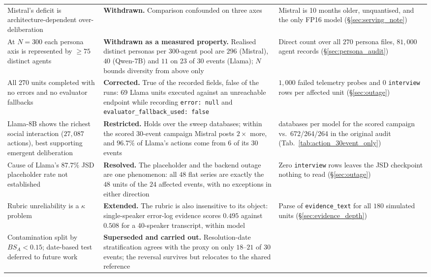 \documentclass[11pt,journal,onecolumn]{IEEEtran}
\begin{document}
\begin{table}[!htbp]
\begin{tabular}{>{\raggedright\arraybackslash}p{4.4cm}>{\raggedright\arraybackslash}p{5.6cm}>{\raggedright\arraybackslash}p{5.6cm}}
\addlinespace
Mistral's deficit is architecture-dependent over-deliberation &
\textbf{Withdrawn.} Comparison confounded on three axes &
Mistral is 10 months older, unquantised, and the only FP16 model (\S\ref{sec:serving_note}) \\
\addlinespace
At $N=300$ each persona axis is represented by $\geq 75$ distinct agents &
\textbf{Withdrawn as a measured property.} Realised distinct personas per 300-agent pool are $296$ (Mistral), $40$ (Qwen-7B) and $11$ on 23 of 30 events (Llama); $N$ bounds diversity from above only &
Direct count over all $270$ persona files, $81{,}000$ agent records (\S\ref{sec:persona_audit}) \\
\addlinespace
All 270 units completed with no errors and no evaluator fallbacks &
\textbf{Corrected.} True of the recorded fields, false of the runs: 69 Llama units executed against an unreachable endpoint while recording \texttt{error: null} and \texttt{evaluator\_fallback\_used: false} &
$1{,}000$ failed telemetry probes and $0$ \texttt{interview} rows per affected unit (\S\ref{sec:outage}) \\
\addlinespace
Llama-8B shows the richest social interaction ($27{,}087$ actions), best supporting emergent deliberation &
\textbf{Restricted.} Holds over the sweep databases; within the scored 30-event campaign Mistral posts $2\times$ more, and $96.7\%$ of Llama's actions come from 6 of its 30 events &
120 databases per model for the scored campaign vs.\ 672/264/264 in the original audit (Tab.~\ref{tab:action_30event_only}) \\
\addlinespace
Cause of Llama's $87.7\%$ JSD placeholder rate not established &
\textbf{Resolved.} The placeholder and the backend outage are one phenomenon: all $48$ flat series are exactly the $48$ units of the $24$ affected events, with no exceptions in either direction &
Zero \texttt{interview} rows leaves the JSD checkpoint nothing to read (\S\ref{sec:outage}) \\
\addlinespace
Rubric unreliability is a $\kappa$ problem &
\textbf{Extended.} The rubric is also insensitive to its object: single-speaker error-log evidence scores $0.495$ against $0.508$ for a 40-speaker transcript, within model &
Parse of \texttt{evidence\_text} for all $180$ simulated units (\S\ref{sec:evidence_depth}) \\
\addlinespace
Contamination split by $BS_A < 0.15$; date-based test deferred to future work &
\textbf{Superseded and carried out.} Resolution-date stratification agrees with the proxy on only $18$--$21$ of $30$ events; the reversal survives but relocates to the shared reference &

\end{tabular}
\end{table}
\end{document}
